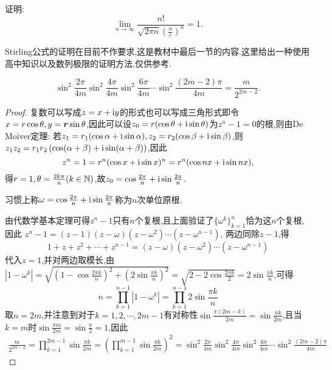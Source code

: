 \begin{example}[Stirling公式]
    证明:$$\lim_{n \to \infty} \frac{n !}{\sqrt{2 \pi n} \left( \frac{n}{e} \right)^n} = 1.$$
\end{example}

Stirling公式的证明在目前不作要求,这是教材中最后一节的内容.这里给出一种使用高中知识以及数列极限的证明方法,仅供参考.

\begin{lemma}\label{lem:Stirling-1}
    $$\sin^2\frac{2\pi}{4m}\sin^2\frac{4\pi}{4m}\sin^2\frac{6\pi}{4m}\cdots\sin^2\frac{(2m-2)\pi}{4m} = \frac{m}{2^{2m-2}}.$$
\end{lemma}

\begin{proof}
    复数可以写成$z = x + \mathrm{i} y$的形式也可以写成三角形式即令$ x = r \cos \theta, y = \bm{r} \sin \theta$,因此可以设$z_0 = r ( \cos \theta + \mathrm{i} \sin \theta)$为$z^n - 1 =0$的根,则由De Moiver定理:
    若$z_1 = r_1 ( \cos \alpha + \mathrm{i} \sin \alpha) , z_2  = r_2 ( \cos \beta + \mathrm{i} \sin \beta)$,则$z_1 z_2 = r_1 r_2 \left( \cos (\alpha+ \beta) + \mathrm{i} \sin (\alpha+ \beta) \right)$,因此
    $$z^n = 1 = r^n ( \cos x + \mathrm{i} \sin x)^n = r^n ( \cos nx + \mathrm{i} \sin nx), $$得$r=1, \theta = \frac{2k \pi}{n} ( k \in \mathbb{N})$,故$z_0 = \cos \frac{2\pi}{n} + \mathrm{i} \sin \frac{2\pi}{n}$.

    习惯上称$\omega = \cos \frac{2\pi}{n} + \mathrm{i} \sin \frac{2\pi}{n}$称为$n$次单位原根.

    由代数学基本定理可得$z^n-1$只有$n$个复根,且上面验证了$\{ \omega^k \}_{k=1}^n$恰为这$n$个复根,因此
    $z^n - 1 = (z-1)(z-\omega)(z-\omega^2) \cdots (z-\omega^{n-1})$,
    两边同除$z-1$,得
    $$1 + z + z^2 + \cdots + z^{n-1} = (z-\omega)(z-\omega^2) \cdots (z-\omega^{n-1})$$
    代入$z=1$,并对两边取模长,由$\left|1-\omega^{k}\right| = \sqrt{\left( 1- \cos \frac{2\pi k}{n}\right)^2 + \left(2\sin \frac{\pi k}{n}\right)^2 } = \sqrt{2-2\cos \frac{2\pi k}{2}} = 2\sin \frac{\pi k}{n}$,可得
    $$n = \prod_{k=1}^{n-1} \left| 1- \omega^k \right| = \prod_{k=1}^{n-1} {2 \sin \frac{\pi k}{n}}$$
    取$n=2m$,并注意到对于$k=1,2,\cdots,2m-1$有对称性$\sin \frac{\pi (2m -k)}{2m} = \sin \frac{\pi k}{2m}$,且当$k =m$时$\sin \frac{\pi m}{2m} = \sin \frac{\pi}{2} =1$,因此
    \begin{align*}
        \frac{m}{2^{2m-2}} = \prod_{k=1}^{2m-1} \sin \frac{\pi k}{2m} = \left( \prod_{k=1}^{m-1} \sin \frac{\pi k}{2m} \right)^2 =\sin^2\frac{2\pi}{4m}\sin^2\frac{4\pi}{4m}\sin^2\frac{6\pi}{4m}\cdots\sin^2\frac{(2m-2)\pi}{4m}
    \end{align*}
\end{proof}

